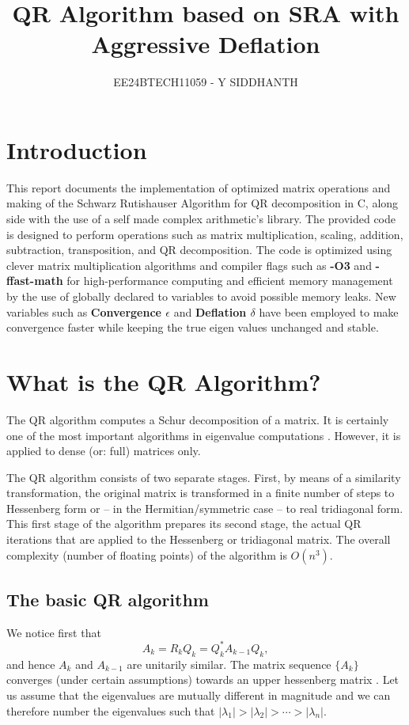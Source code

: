 \documentclass[12pt]{article}
\title{QR Algorithm based on SRA with Aggressive Deflation}
\author{EE24BTECH11059 - Y SIDDHANTH}
\begin{document}
	
	\maketitle
	\tableofcontents %
	\clearpage
	
	\section{Introduction}
	This report documents the implementation of optimized matrix operations and making of the Schwarz Rutishauser Algorithm for QR decomposition in C, along side with the use of a self made complex arithmetic's library. The provided code is designed to perform operations such as matrix multiplication, scaling, addition, subtraction, transposition, and QR decomposition. The code is optimized using clever matrix multiplication algorithms and compiler flags such as \textbf{-O3} and \textbf{-ffast-math} for high-performance computing and efficient memory management by the use of globally declared to variables to avoid possible memory leaks. New variables such as \textbf{Convergence $\epsilon$} and \textbf{Deflation $\delta$} have been employed to make convergence faster while keeping the true eigen values unchanged and stable.
	\newpage
	\section{What is the QR Algorithm? \cite{5}}
	The QR algorithm computes a Schur decomposition of a matrix. It is certainly one of the most important algorithms in eigenvalue computations \cite{6}. However, it is applied to dense (or: full) matrices only.
	
	The QR algorithm consists of two separate stages. First, by means of a similarity transformation, the original matrix is transformed in a finite number of steps to Hessenberg form or -- in the Hermitian/symmetric case -- to real tridiagonal form. This first stage of the algorithm prepares its second stage, the actual QR iterations that are applied to the Hessenberg or tridiagonal matrix. The overall complexity (number of floating points) of the algorithm is \( O(n^3) \).
	\subsection{The basic QR algorithm}
	We notice first that
	\begin{equation}
		A_k = R_k Q_k = Q_k^* A_{k-1} Q_k,
	\end{equation}
	and hence $A_k$ and $A_{k-1}$ are unitarily similar. The matrix sequence $\{A_k\}$ converges (under certain assumptions) towards an upper hessenberg matrix .
	Let us assume that the eigenvalues are mutually different in magnitude and we can therefore number the eigenvalues such that $|\lambda_1| > |\lambda_2| > \cdots > |\lambda_n|$. 
	
\end{document}
